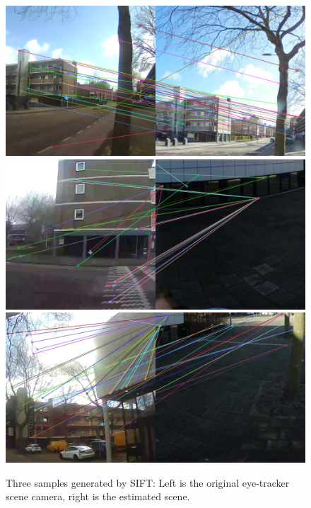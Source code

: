 \documentclass[sigconf, natbib=false, nonacm]{acmart}
\begin{document}
        \begin{figure}
            \includegraphics[width=\linewidth]{figures/4-sift1-048.png}
            \includegraphics[width=\linewidth]{figures/4-sift2-117.png}
            \includegraphics[width=\linewidth]{figures/4-sift3-143.png}
            \caption{Three samples generated by SIFT: Left is the original eye-tracker scene camera, right is the estimated scene. } 
            \label{fig:sift-sample}
        \end{figure} 
    
\end{document}
